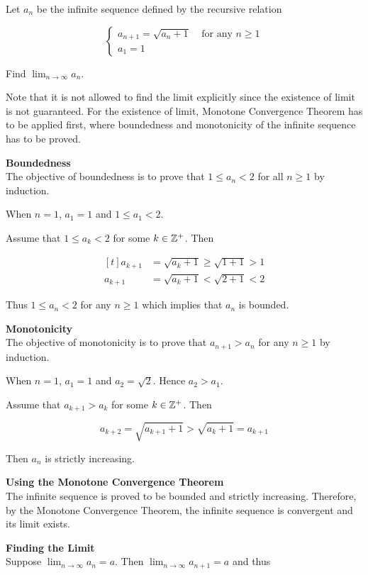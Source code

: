\documentclass[a4paper,12pt]{article}
\begin{document}
\begin{exm}
  Let $a_{n}$ be the infinite sequence defined by the recursive relation

  $$\left\{\begin{matrix}
    a_{n+1}=\sqrt{a_{n}+1}\;\;\;\;\text{for any }n\geq 1 \\
    a_{1}=1
  \end{matrix}\right.$$\s

  Find $\lim_{n\to \infty}a_{n}$.\n

  \ans Note that it is not allowed to find the limit explicitly since the existence of limit is not guaranteed. For the existence of limit, Monotone Convergence Theorem has to be applied first, where boundedness and monotonicity of the infinite sequence has to be proved.\n

  \begin{alist}
   \item \textbf{Boundedness}\\
   The objective of boundedness is to prove that $1\leq a_{n}<2$ for all $n\geq 1$ by induction.\n
   \begin{rlist}
     \item When $n=1$, $a_{1}=1$ and $1\leq a_{1}<2$.
     \item Assume that $1\leq a_{k}<2$ for some $k\in \mathbb{Z}^{+}$. Then

     $$\begin{aligned}[t]
       a_{k+1}&=\sqrt{a_{k}+1}\geq \sqrt{1+1}>1\\
       a_{k+1}&=\sqrt{a_{k}+1}<\sqrt{2+1}<2
     \end{aligned}$$
   \end{rlist}
   Thus $1\leq a_{n}<2$ for any $n\geq 1$ which implies that $a_{n}$ is bounded.
   \item \textbf{Monotonicity}\\
   The objective of monotonicity is to prove that $a_{n+1}>a_{n}$ for any $n\geq 1$ by induction.\n
   \begin{rlist}
     \item When $n=1$, $a_{1}=1$ and $a_{2}=\sqrt{2}$. Hence $a_{2}>a_{1}$.
     \item Assume that $a_{k+1}>a_{k}$ for some $k\in \mathbb{Z}^{+}$. Then

     $$a_{k+2}=\sqrt{a_{k+1}+1}>\sqrt{a_{k}+1}=a_{k+1}$$
   \end{rlist}
   Then $a_{n}$ is strictly increasing.
   \item \textbf{Using the Monotone Convergence Theorem}\\
   The infinite sequence is proved to be bounded and strictly increasing. Therefore, by the Monotone Convergence Theorem, the infinite sequence is convergent and its limit exists.
   \item \textbf{Finding the Limit}\\
   Suppose $\lim_{n\to \infty}a_{n}=a$. Then $\lim_{n\to \infty}a_{n+1}=a$ and thus


\end{alist}
\end{exm}
\end{document}
